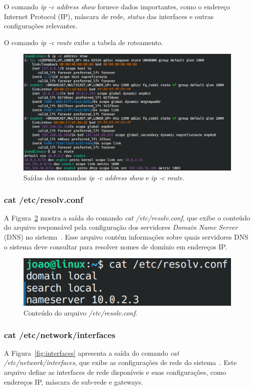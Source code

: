 \documentclass[
	12pt,				%
	oneside,   	        %
	a4paper,			%
	english,			%
	french,				%
	spanish,			%
	brazil,				%
	]{pacotes/abntex2}
\begin{document}
O comando \textit{ip -c address show} fornece dados importantes, como o endereço Internet Protocol (IP), máscara de rede, \textit{status} das interfaces e outras configurações relevantes.

O comando \textit{ip -c route} exibe a tabela de roteamento.

\begin{figure}[H]
  \centering
  \includegraphics[scale=0.5]{figuras/ip.png}
  \caption{Saídas dos comandos \textit{ip -c address show} e \textit{ip -c route}.}
  \label{fig:ip}
\end{figure}

\subsubsection{cat /etc/resolv.conf}
A Figura~\ref{fig:resolv} mostra a saída do comando \textit{cat /etc/resolv.conf}, que exibe o conteúdo do arquivo responsável pela configuração dos servidores \textit{Domain Name Server} (DNS) no sistema~\cite{negus2012}. Esse arquivo contém informações sobre quais servidores DNS o sistema deve consultar para resolver nomes de domínio em endereços IP.  

\begin{figure}[H]
  \centering
  \includegraphics[scale=0.37]{figuras/resolv.png}
  \caption{Conteúdo do arquivo \textit{/etc/resolv.conf}.}
  \label{fig:resolv}
\end{figure}

\subsubsection{cat /etc/network/interfaces}
A Figura~\ref{fig:interfaces} apresenta a saída do comando \textit{cat /etc/network/interfaces}, que exibe as configurações de rede do sistema~\cite{guiafocaIntermediario}. Este arquivo define as interfaces de rede disponíveis e suas configurações, como endereços IP, máscara de sub-rede e gateways.
\end{document}
